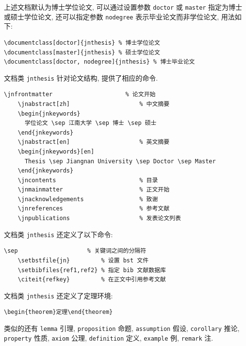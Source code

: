上述文档默认为博士学位论文, 可以通过设置参数 {\tt doctor} 或 {\tt master} 指定为博士或硕士学位论文, 还可以指定参数 {\tt nodegree} 表示毕业论文而非学位论文,
用法如下:
\begin{lstlisting}[basicstyle=\ttfamily, frame=single]
\documentclass[doctor]{jnthesis} % 博士学位论文
\documentclass[master]{jnthesis} % 硕士学位论文
\documentclass[doctor, nodegree]{jnthesis} % 博士毕业论文
\end{lstlisting}

文档类 {\tt jnthesis} 针对论文结构, 提供了相应的命令.

\begin{lstlisting}[basicstyle=\ttfamily, frame=single]
    \jnfrontmatter                     % 论文开始
    \jnabstract[zh]                    % 中文摘要
    \begin{jnkeywords}
      学位论文 \sep 江南大学 \sep 博士 \sep 硕士
    \end{jnkeywords}
    \jnabstract[en]                    % 英文摘要
    \begin{jnkeywords}[en]
      Thesis \sep Jiangnan University \sep Doctor \sep Master
    \end{jnkeywords}
    \jncontents                        % 目录
    \jnmainmatter                      % 正文开始
    \jnacknowledgements                % 致谢
    \jnreferences                      % 参考文献
    \jnpublications                    % 发表论文列表
\end{lstlisting}

文档类 {\tt jnthesis} 还定义了以下命令:

\begin{lstlisting}[basicstyle=\ttfamily, frame=single]
    \sep                    % 关键词之间的分隔符
    \setbstfile{jn}         % 设置 bst 文件
    \setbibfiles{ref1,ref2} % 指定 bib 文献数据库
    \citeit{refkey}         % 在正文中引用参考文献
\end{lstlisting}

文档类 {\tt jnthesis} 还定义了定理环境:

\begin{lstlisting}[basicstyle=\ttfamily, frame=single]
\begin{theorem}定理\end{theorem}
\end{lstlisting}

类似的还有 {\tt lemma} 引理,
{\tt proposition} 命题,
{\tt assumption} 假设,
{\tt corollary} 推论,
{\tt property} 性质,
{\tt axiom} 公理,
{\tt definition} 定义,
{\tt example} 例,
{\tt remark} 注.


